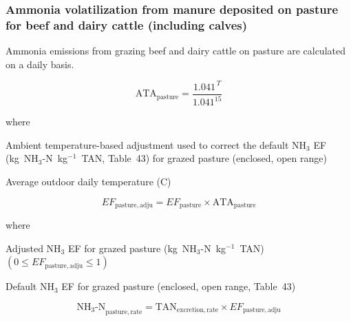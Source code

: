 \subsubsection{Ammonia volatilization from manure deposited on pasture for beef and dairy cattle (including calves)}
\label{subsubsec:grazing-nh3-cattle-eq}

Ammonia emissions from grazing beef and dairy cattle on pasture are calculated
on a daily basis.

\begin{equation}
    \mathrm{ATA}_{\mathrm{pasture}}
        = \frac{1.041^{\,T}}{1.041^{15}}
    \tag{Eq.\ 5.4.1-1}
\end{equation}

\noindent where

\begin{description}[font=\normalfont, leftmargin=9em, style=sameline, nosep]
    \item[$\mathrm{ATA}_{\mathrm{pasture}}$]
        Ambient temperature-based adjustment used to correct the default NH$_3$
        EF (kg~NH$_3$-N~kg$^{-1}$~TAN, Table~43) for grazed pasture (enclosed,
        open range)
    \item[$T$] Average outdoor daily temperature (\textdegree C)
\end{description}

\begin{equation}
    \mathit{EF}_{\mathrm{pasture,adju}}
        = \mathit{EF}_{\mathrm{pasture}} \times \mathrm{ATA}_{\mathrm{pasture}}
    \tag{Eq.\ 5.4.1-2}
\end{equation}

\noindent where

\begin{description}[font=\normalfont, leftmargin=9em, style=sameline, nosep]
    \item[$\mathit{EF}_{\mathrm{pasture,adju}}$]
        Adjusted NH$_3$ EF for grazed pasture (kg~NH$_3$-N~kg$^{-1}$~TAN)
        $(0 \leq \mathit{EF}_{\mathrm{pasture,adju}} \leq 1)$
    \item[$\mathit{EF}_{\mathrm{pasture}}$]
        Default NH$_3$ EF for grazed pasture (enclosed, open range, Table~43)
\end{description}

\begin{equation}
    \mathrm{NH_3\text{-}N}_{\mathrm{pasture,rate}}
        = \mathrm{TAN}_{\mathrm{excretion,rate}}
          \times \mathit{EF}_{\mathrm{pasture,adju}}
    \tag{Eq.\ 5.4.1-3}
\end{equation}


